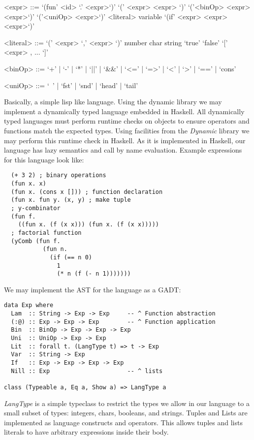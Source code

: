\documentclass{article}
\begin{document}
\begin{grammar}

<expr> ::= `(fun' <id> `.' <expr>`)'
\alt `(' <expr> <expr> `)'
\alt `('<binOp> <expr> <expr>`)'
\alt `('<uniOp> <expr>`)'
\alt <literal>
\alt variable
\alt `(if' <expr> <expr> <expr>`)'

<literal> ::= `(' <expr> `,' <expr> `)'
\alt number
\alt char
\alt string
\alt `true'
\alt `false'
\alt `[' <expr> , ... `]'

<binOp> ::= `+' | `-' | `*' | `||' | `&&' | `<=' | `=>' | `<' | `>' | `==' | `cons'

<uniOp> ::= `~' | `fst' | `snd' | `head' | `tail'

\end{grammar}
Basically, a simple lisp like language. Using the dynamic library we may implement a dynamically typed language embedded in Haskell. All dynamically typed languages must perform runtime checks on objects to ensure operators and functions match the expected types. Using facilities from the \textit{Dynamic} library we may perform this runtime check in Haskell. As it is implemented in Haskell, our language has lazy semantics and call by name evaluation. Example expressions for this language look like:
\begin{verbatim}
  (+ 3 2) ; binary operations
  (fun x. x)
  (fun x. (cons x [])) ; function declaration
  (fun x. fun y. (x, y) ; make tuple
  ; y-combinator
  (fun f.
    ((fun x. (f (x x))) (fun x. (f (x x)))))
  ; factorial function
  (yComb (fun f.
           (fun n.
             (if (== n 0)
               1
               (* n (f (- n 1)))))))

\end{verbatim}
We may implement the AST for the language as a GADT:
\begin{verbatim}
data Exp where
  Lam  :: String -> Exp -> Exp     -- ^ Function abstraction
  (:@) :: Exp -> Exp -> Exp        -- ^ Function application
  Bin  :: BinOp -> Exp -> Exp -> Exp
  Uni  :: UniOp -> Exp -> Exp
  Lit  :: forall t. (LangType t) => t -> Exp
  Var  :: String -> Exp
  If   :: Exp -> Exp -> Exp -> Exp
  Nill :: Exp                      -- ^ lists

class (Typeable a, Eq a, Show a) => LangType a

\end{verbatim}
\textit{LangType} is a simple typeclass to restrict the types we allow in our language to a small subset of types: integers, chars, booleans, and strings. Tuples and Lists are implemented as language constructs and operators. This allows tuples and lists literals to have arbitrary expressions inside their body.
\end{document}
